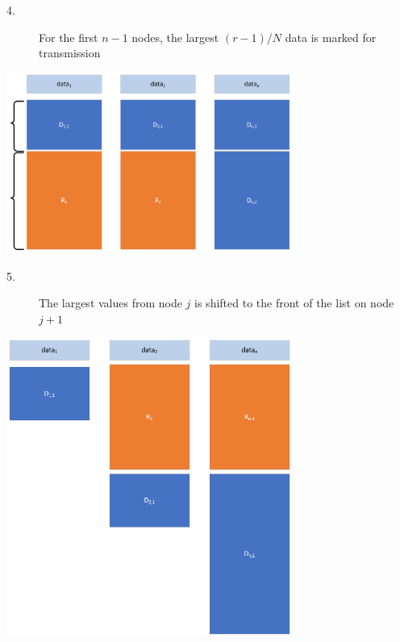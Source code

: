 \documentclass[letter]{article}
\begin{document}
\newpage

\begin{description}
\item[4.]{For the first $n-1$ nodes, the largest $(r-1)/N$ data is marked for transmission}
\end{description}
\includegraphics[width=0.7\textwidth]{images/Capture2.PNG}

\begin{description}
\item[5.]{The largest values from node $j$ is shifted to the front of the list on node $j+1$}
\end{description}
\includegraphics[width=0.7\textwidth]{images/Capture3.PNG}

\newpage
\end{document}
